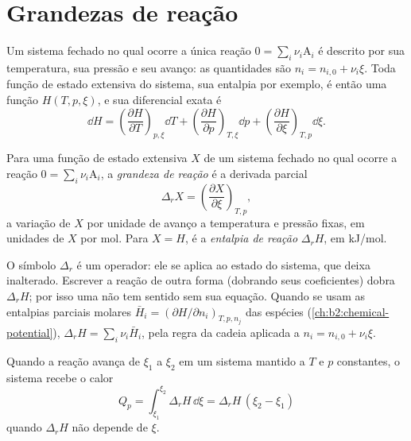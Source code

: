 \section{Grandezas de reação}

Um sistema fechado no qual ocorre a única reação $0 = \sum_i\nu_i\mathrm A_i$
é descrito por sua temperatura, sua pressão e seu avanço: as quantidades
são $n_i = n_{i,0} + \nu_i\xi$. Toda função de estado extensiva do
sistema, sua entalpia por exemplo, é então uma função $H(T, p,
\xi)$, e sua diferencial exata é
\[
  \dd H = \left(\frac{\partial H}{\partial T}\right)_{p,\xi}\dd T
        + \left(\frac{\partial H}{\partial p}\right)_{T,\xi}\dd p
        + \left(\frac{\partial H}{\partial \xi}\right)_{T,p}\dd\xi .
\]

\begin{definition}\label{def:b2:reaction-enthalpy:reaction-quantity}
Para uma função de estado extensiva $X$ de um sistema fechado no qual
ocorre a reação $0 = \sum_i\nu_i\mathrm A_i$, a \emph{grandeza de
reação} é a derivada parcial
\[
  \Delta_r X = \left(\frac{\partial X}{\partial \xi}\right)_{T,p} ,
\]
a variação de $X$ por unidade de avanço a temperatura e pressão fixas, em
unidades de $X$ por mol. Para $X = H$, é a \emph{entalpia de
reação} $\Delta_r H$, em \unit{kJ/mol}.
\end{definition}

\begin{remark}\label{rem:b2:reaction-enthalpy:operator}
O símbolo $\Delta_r$ é um operador: ele se aplica ao estado do
sistema, que deixa inalterado. Escrever a reação de outra forma
(dobrando seus coeficientes) dobra $\Delta_r H$; por isso uma  não tem sentido sem sua equação. Quando se usam as entalpias
parciais molares
$\bar H_i = (\partial H/\partial n_i)_{T,p,n_j}$ das espécies
(\cref{ch:b2:chemical-potential}), $\Delta_r H = \sum_i\nu_i\bar H_i$, pela
regra da cadeia aplicada a $n_i = n_{i,0} + \nu_i\xi$.
\end{remark}

\begin{proposition}\label{prop:b2:reaction-enthalpy:qp}
Quando a reação avança de $\xi_1$ a $\xi_2$ em um sistema mantido a
$T$ e $p$ constantes, o sistema recebe o calor
\[
  Q_p = \int_{\xi_1}^{\xi_2}\Delta_r H\,\dd\xi = \Delta_r H\,(\xi_2 - \xi_1)
\]
quando $\Delta_r H$ não depende de $\xi$.
\end{proposition}


